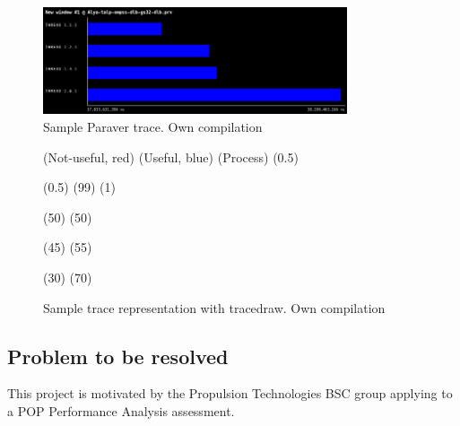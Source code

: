 \begin{itemize}
    \begin{figure}[htbp]
      \centering
      \includegraphics[width=0.8\textwidth]{sample_trace}
      \caption[Sample Paraver trace]{Sample Paraver trace. Own compilation}
      \label{fig:trace}
    \end{figure}

    \begin{figure}[htbp]
      \begin{tracedraw}
        \tracedrawAddToLegend(\large{Not-useful}, red)
        \tracedrawAddToLegend(\large{Useful}, blue)
        \tracedrawEnableLineName(\large{Process})
        \tracedrawSetLegendColorScale(0.5)

        \tracedrawSetLineHeight(0.5)
        \tracedrawAddChunk[color=gray, fill=blue](99)
        \tracedrawAddChunk[color=gray, fill=red](1)

        \tracedrawNewLine

        \tracedrawAddChunk[color=gray, fill=blue](50)
        \tracedrawAddChunk[color=gray, fill=red](50)

        \tracedrawNewLine
        
        \tracedrawAddChunk[color=gray, fill=blue](45)
        \tracedrawAddChunk[color=gray, fill=red](55)

        \tracedrawNewLine
        
        \tracedrawAddChunk[color=gray, fill=blue](30)
        \tracedrawAddChunk[color=gray, fill=red](70)

      \end{tracedraw}
      \caption[Sample trace representation with tracedraw]{Sample trace representation with tracedraw. Own compilation}
      \label{fig:tracedraw}
    \end{figure}

\end{itemize}

\subsection{Problem to be resolved}
\justify
This project is motivated by the Propulsion Technologies BSC group applying to a POP Performance Analysis assessment.

